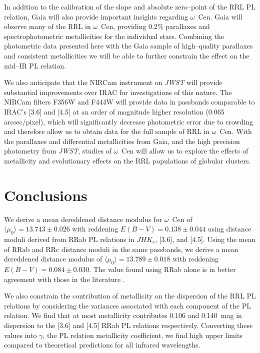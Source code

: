 \documentclass[a4paper,fleqn,usenatbib]{mnras}
\newcommand{\ocen}{$\omega$~Cen\xspace}
\begin{document}
In addition to the calibration of the slope and absolute zero--point of the RRL PL relation, Gaia will also provide important insights regarding \ocen. Gaia will observe many of the RRL in \ocen \citep{2002ASPC..265..415B}, providing 0.2\% parallaxes and spectrophotometric metallicities for the individual stars. Combining the photometric data presented here with the Gaia sample of high--quality parallaxes and consistent metallicities we will be able to further constrain the effect on the mid--IR PL relation.

We also anticipate that the NIRCam instrument on {\em JWST} \citep{2005SPIE.5904...21B, 2006SSRv..123..485G} will provide substantial improvements over IRAC for investigations of this nature. The NIRCam filters F356W and F444W will provide data in passbands comparable to IRAC's [3.6] and [4.5] at an order of magnitude higher resolution (0.065 arcsec/pixel), which will significantly decrease photometric error due to crowding and therefore allow us to obtain data for the full sample of RRL in \ocen. With the parallaxes and differential metallicities from Gaia, and the high precision photometry from {\it JWST}, studies of \ocen will allow us to explore the effects of metallicity and evolutionary effects on the RRL populations of globular clusters. 


\section{Conclusions}
\label{sec:conclusions}

We derive a mean dereddened distance modulus for \ocen of ${\langle \mu_0 \rangle = 13.743 \pm 0.026}$ with reddening ${E(B-V) = 0.138 \pm 0.044}$ using distance moduli derived from RRab PL relations in $JHK_s$, [3.6], and [4.5]. Using the mean of RRab and RRc distance moduli in the same passbands, we derive a mean dereddened distance modulus of ${\langle \mu_0 \rangle = 13.789 \pm 0.018}$ with reddening ${E(B-V) = 0.084 \pm 0.030}$. The value found using RRab alone is in better agreement with those in the literature \citep[e.g.][]{2002ASPC..265...95L, 2006ApJ...652..362D}.

We also constrain the contribution of metallicity on the dispersion of the RRL PL relations by considering the variances associated with each component of the PL relation. We find that at most metallicity contributes 0.106 and 0.140~mag in dispersion to the [3.6] and [4.5] RRab PL relations respectively. Converting these values into $\gamma$, the PL relation metallicity coefficient, we find high upper limits compared to theoretical predictions for all infrared wavelengths. 
\end{document}

